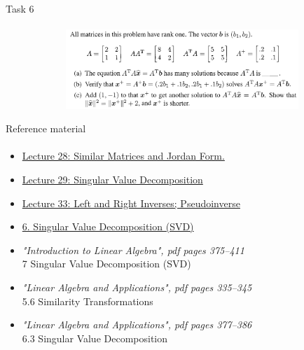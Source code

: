 \documentclass[aspectratio=169]{beamer}
\begin{document}
\begin{frame}[t]{Task 6}
    \framesubtitle{}
    \vspace{-0.5cm}
    \begin{figure}[H]
        \centering\includegraphics[height=3cm,width=1\textwidth,keepaspectratio]{6.png}
        \label{fig:6.png}
    \end{figure}
\end{frame}

\begin{frame}[t]{Reference material}
    \framesubtitle{}
    \large
    \begin{itemize}
        \item \href{https://www.youtube.com/watch?v=TSdXJw83kyA}{Lecture 28: Similar Matrices and Jordan Form.}
        \item \href{https://www.youtube.com/watch?v=Nx0lRBaXoz4&list=PL49CF3715CB9EF31D&index=30}{Lecture 29: Singular Value Decomposition}
        \item \href{https://www.youtube.com/watch?v=Go2aLo7ZOlU&list=PL49CF3715CB9EF31D&index=34}{Lecture 33: Left and Right Inverses; Pseudoinverse}
        \item \href{https://www.youtube.com/watch?v=rYz83XPxiZo&list=PLUl4u3cNGP63oMNUHXqIUcrkS2PivhN3k&index=8}{6. Singular Value Decomposition (SVD)}
        \item \textit{"Introduction to Linear Algebra", pdf pages 375--411 }\\  7 Singular Value Decomposition (SVD)
        \item \textit{"Linear Algebra and Applications", pdf pages 335--345 }\\ 5.6 Similarity Transformations
        \item \textit{"Linear Algebra and Applications", pdf pages 377--386 }\\ 6.3 Singular Value Decomposition
    \end{itemize}
\end{frame}
\end{document}
